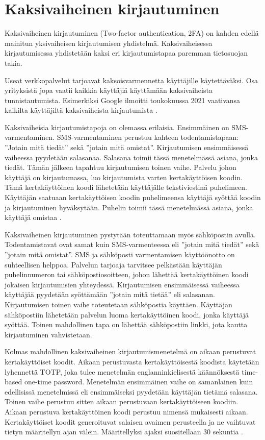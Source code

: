 \section{Kaksivaiheinen kirjautuminen}
Kaksivaiheinen kirjautuminen (Two-factor authentication, 2FA) on kahden edellä mainitun yksivaiheisen kirjautumisen yhdistelmä. Kaksivaiheisessa kirjautumisessa yhdistetään kaksi eri kirjautumistapaa paremman tietosuojan takia. 

Useat verkkopalvelut tarjoavat kaksoisvarmennetta käyttäjille käytettäväksi. Osa yrityksistä jopa vaatii kaikkia käyttäjiä käyttämään kaksivaiheista tunnistautumista. Esimerkiksi Google ilmoitti toukokuussa 2021 vaativansa kaikilta käyttäjiltä kaksivaiheista kirjautumista \citep{future_without_passwords}.

Kaksivaiheisia kirjautumistapoja on olemassa erilaisia. Ensimmäinen on SMS-varmentaminen. SMS-varmentaminen perustuu kahteen todentamistapaan: ”Jotain mitä tiedät” sekä ”jotain mitä omistat”. Kirjautumisen ensimmäisessä vaiheessa pyydetään salasanaa. Salasana toimii tässä menetelmässä asiana, jonka tiedät. Tämän jälkeen tapahtuu kirjautumisen toinen vaihe. Palvelu johon käyttäjä on kirjautumassa, luo kirjautumista varten kertakäyttöisen koodin. Tämä kertakäyttöinen koodi lähetetään käyttäjälle tekstiviestinä puhelimeen. Käyttäjän saatuaan kertakäyttöisen koodin puhelimeensa käyttäjä syöttää koodin ja kirjautuminen hyväksytään. Puhelin toimii tässä menetelmässä asiana, jonka käyttäjä omistaa \citep{jover2020security}.

Kaksivaiheinen kirjautuminen pystytään toteuttamaan myös sähköpostin avulla. Todentamistavat ovat samat kuin SMS-varmenteessa eli ”jotain mitä tiedät” sekä ”jotain mitä omistat”. SMS ja sähköposti varmentamisen käyttöönotto on suhteellisen helppoa. Palvelun tarjoaja tarvitsee pelkästään käyttäjän puhelinnumeron tai sähköpostiosoitteen, johon lähettää kertakäyttöinen koodi jokaisen kirjautumisien yhteydessä. Kirjautumisen ensimmäisessä vaiheessa käyttäjää pyydetään syöttämään ”jotain mitä tietää” eli salasanan. Kirjautumisen toinen vaihe toteutetaan sähköpostia käyttäen. Käyttäjän sähköpostiin lähetetään palvelun luoma kertakäyttöinen koodi, jonka käyttäjä syöttää. Toinen mahdollinen tapa on lähettää sähköpostiin linkki, jota kautta kirjautuminen vahvistetaan.

Kolmas mahdollinen kaksivaiheinen kirjautumismenetelmä on aikaan perustuvat kertakäyttöiset koodit. Aikaan perustuvasta kertakäyttöisestä koodista käytetään lyhennettä TOTP, joka tulee menetelmän englanninkielisestä käännöksestä time-based one-time password. Menetelmän ensimmäinen vaihe on samanlainen kuin edellisissä menetelmissä eli ensimmäiseksi pyydetään käyttäjän tietämä salasana. Toinen vaihe perustuu sitten aikaan perustuvaan kertakäyttöiseen koodiin. Aikaan perustuva kertakäyttöinen koodi perustuu nimensä mukaisesti aikaan. Kertakäyttöiset koodit generoituvat salaisen avaimen perusteella ja ne vaihtuvat tietyn määritellyn ajan välein. Määritellyksi ajaksi suositellaan 30 sekuntia \citep{m2011totp} \citep{NIST_800_63B}.

